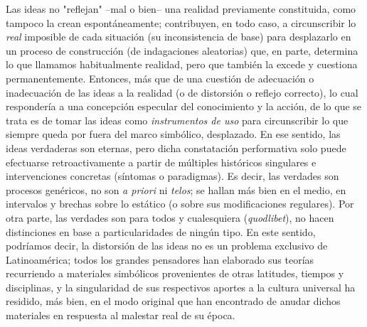 Las ideas no "reflejan" --mal o bien-- una realidad previamente
constituida, como tampoco la crean espontáneamente; contribuyen, en todo
caso, a circunscribir lo \emph{real} imposible de cada situación (su
inconsistencia de base) para desplazarlo en un proceso de construcción
(de indagaciones aleatorias) que, en parte, determina lo que llamamos
habitualmente realidad, pero que también la excede y cuestiona
permanentemente. Entonces, más que de una cuestión de adecuación o
inadecuación de las ideas a la realidad (o de distorsión o reflejo
correcto), lo cual respondería a una concepción especular del
conocimiento y la acción, de lo que se trata es de tomar las ideas como
\emph{instrumentos de uso} para circunscribir lo que siempre queda por
fuera del marco simbólico, desplazado. En ese sentido, las ideas
verdaderas son eternas, pero dicha constatación performativa solo puede
efectuarse retroactivamente a partir de múltiples históricos singulares
e intervenciones concretas (síntomas o paradigmas). Es decir, las
verdades son procesos genéricos, no son \emph{a priori} ni \emph{telos};
se hallan más bien en el medio, en intervalos y brechas sobre lo
estático (o sobre sus modificaciones regulares). Por otra parte, las
verdades son para todos y cualesquiera (\emph{quodlibet}), no hacen
distinciones en base a particularidades de ningún tipo. En este sentido,
podríamos decir, la distorsión de las ideas no es un problema exclusivo
de Latinoamérica; todos los grandes pensadores han elaborado sus teorías
recurriendo a materiales simbólicos provenientes de otras latitudes,
tiempos y disciplinas, y la singularidad de sus respectivos aportes a la
cultura universal ha residido, más bien, en el modo original que han
encontrado de anudar dichos materiales en respuesta al malestar real de
su época.

